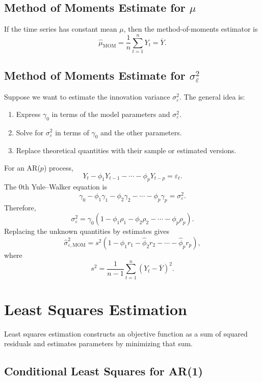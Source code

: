 \documentclass[12pt,oneside]{book}
\numberwithin{equation}{section}
\theoremstyle{definition}
\theoremstyle{plain}
\theoremstyle{remark}
\begin{document}
\subsection{Method of Moments Estimate for $\mu$}

If the time series has constant mean $\mu$, then the method-of-moments estimator is
\[
\widehat{\mu}_{\mathrm{MOM}}
=
\frac{1}{n}\sum_{t=1}^nY_t
=
\overline{Y}.
\]

\subsection{Method of Moments Estimate for $\sigma_\varepsilon^2$}

Suppose we want to estimate the innovation variance $\sigma_\varepsilon^2$. The general idea is:

\begin{enumerate}
\item Express $\gamma_0$ in terms of the model parameters and $\sigma_\varepsilon^2$.
\item Solve for $\sigma_\varepsilon^2$ in terms of $\gamma_0$ and the other parameters.
\item Replace theoretical quantities with their sample or estimated versions.
\end{enumerate}

For an AR($p$) process,
\[
Y_t-\phi_1Y_{t-1}-\cdots-\phi_pY_{t-p}=\varepsilon_t.
\]
The $0$th Yule--Walker equation is
\[
\gamma_0-\phi_1\gamma_1-\phi_2\gamma_2-\cdots-\phi_p\gamma_p
=
\sigma_\varepsilon^2.
\]
Therefore,
\[
\sigma_\varepsilon^2
=
\gamma_0(1-\phi_1\rho_1-\phi_2\rho_2-\cdots-\phi_p\rho_p).
\]
Replacing the unknown quantities by estimates gives
\[
\widehat{\sigma}_{\varepsilon,\mathrm{MOM}}^2
=
s^2
\left(
1-\widehat{\phi}_1r_1-\widehat{\phi}_2r_2-\cdots-\widehat{\phi}_pr_p
\right),
\]
where
\[
s^2
=
\frac{1}{n-1}\sum_{t=1}^n(Y_t-\overline{Y})^2.
\]

\section{Least Squares Estimation}

Least squares estimation constructs an objective function as a sum of squared residuals and estimates parameters by minimizing that sum.

\subsection{Conditional Least Squares for AR(1)}
\end{document}
